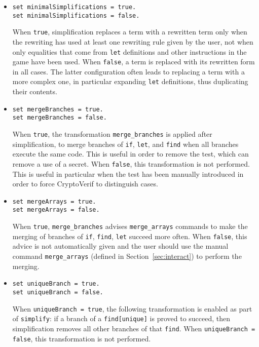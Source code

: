 \begin{itemize}
\begin{itemize}
\item \texttt{set minimalSimplifications = true.}\\
\texttt{set minimalSimplifications = false.}

When {\tt true}, simplification replaces a term with a rewritten term
only when the rewriting has used at least one rewriting rule given
by the user, not when only equalities that come from {\tt let} definitions
and other instructions in the game have been used.
When {\tt false}, a term is replaced with its rewritten form in
all cases. The latter configuration often leads to replacing
a term with a more complex one, in particular expanding {\tt let}
definitions, thus duplicating their contents.

\item \texttt{set mergeBranches = true.}\\
\texttt{set mergeBranches = false.}

When {\tt true}, the transformation {\tt merge\_branches} is applied
after simplification, to merge branches of {\tt if}, {\tt let},
and {\tt find} when all branches execute the same code.
This is useful in order to remove the test, which can remove
a use of a secret.
When {\tt false}, this transformation is not performed. 
This is useful in particular when the test has been
manually introduced in order to force CryptoVerif to
distinguish cases.

\item \texttt{set mergeArrays = true.}\\
\texttt{set mergeArrays = false.}

When {\tt true}, {\tt merge\_branches} advises {\tt merge\_arrays} commands
to make the merging of branches of {\tt if}, {\tt find}, {\tt let}
succeed more often. When {\tt false}, this advice is not
automatically given and the user should use the manual command
{\tt merge\_arrays} (defined in 
Section~\ref{sec:interact}) to perform the merging.

\item \texttt{set uniqueBranch = true.}\\
\texttt{set uniqueBranch = false.}

When {\tt uniqueBranch = true}, the following transformation is 
enabled as part of {\tt simplify}:
if a branch of a {\tt find[unique]} is proved to succeed, 
then simplification removes all other branches of that {\tt find}.
When {\tt uniqueBranch = false}, this transformation is not performed. 


\end{itemize}
\end{itemize}
